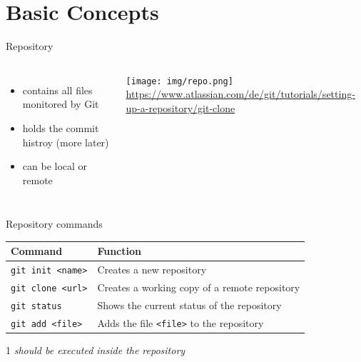 \documentclass[10pt, graphics, aspectratio=169, table]{beamer}
\begin{document}
    \section{Basic Concepts}
    \begin{frame}{Repository}
        \begin{columns}
                \begin{itemize}
                    \item contains all files monitored by Git
                    \item holds the commit histroy (more later)
                    \item can be local or remote
                \end{itemize}
                \center\texttt{[image: img/repo.png]}
                \center\tiny\url{https://www.atlassian.com/de/git/tutorials/setting-up-a-repository/git-clone}
        \end{columns}
    \end{frame}

    \begin{frame}{Repository commands}
        \begin{table}
            \centering
            \begin{threeparttable}
                \begin{tabular}{ll}
                    \toprule
                    Command & Function \\
                    \midrule
                    \texttt{git init <name>} & Creates a new repository \\
                    \texttt{git clone <url>} & Creates a working copy of a remote repository \\
                    \texttt{git status} & Shows the current status of the repository\tnote{1} \\
                    \texttt{git add <file>} & Adds the file \texttt{<file>} to the repository\tnote{1}\\
                    \bottomrule
                \end{tabular}
                \begin{tablenotes}
                    \item [1]\emph{should be executed inside the repository}
                \end{tablenotes}
            \end{threeparttable}
        \end{table}
    \end{frame}
\end{document}
